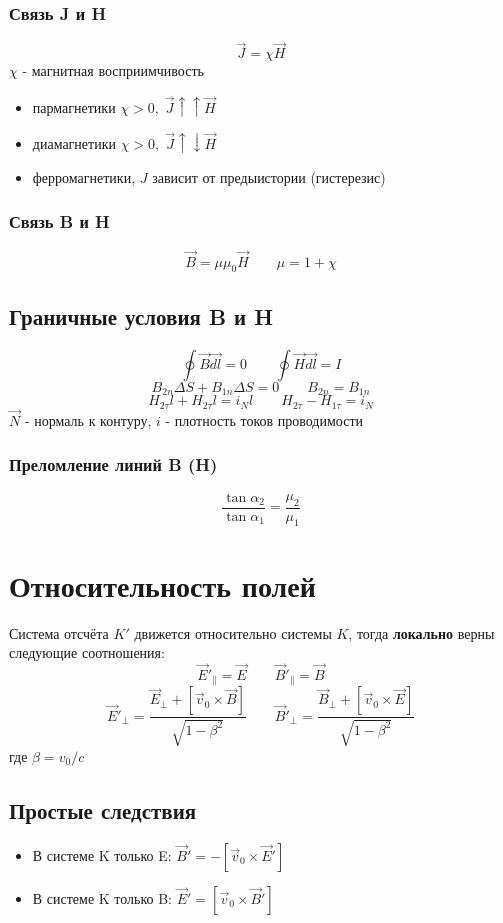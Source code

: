 \documentclass{article}
\begin{document}
\subsubsection{Связь J и H}
\[\vec{J}=\chi\vec{H}\]
$\chi$ - магнитная восприимчивость
\begin{itemize}
    \item пармагнетики $\chi > 0, \; \vec{J}\uparrow\uparrow\vec{H}$
    \item диамагнетики $\chi > 0, \; \vec{J}\uparrow\downarrow\vec{H}$
    \item ферромагнетики, $J$ зависит от предыистории (гистерезис)
\end{itemize}
\subsubsection{Связь B и H}
\[\vec{B}=\mu\mu_{0}\vec{H} \qquad \mu=1+\chi\]

\subsection{Граничные условия B и H}
\[\oint\vec{B}\vec{dl}=0 \qquad \oint\vec{H}\vec{dl}=I\]
\[B_{2n}\Delta S + B_{1n}\Delta S=0 \qquad B_{2n}=B_{1n}\]
\[H_{2\tau}l+H_{2\tau}l=i_{N}l \qquad H_{2\tau}-H_{1\tau}=i_{N}\]
$\vec{N}$ - нормаль к контуру, $i$ - плотность токов проводимости
\subsubsection{Преломление линий B (H)}
\[\frac{\tan\alpha_{2}}{\tan\alpha_{1}}=\frac{\mu_{2}}{\mu_{1}}\]


\section{Относительность полей}
Система отсчёта $K'$ движется относительно системы $K$, тогда \textbf{локально} верны следующие соотношения:
\[\vec{E}'_{\parallel}=\vec{E} \qquad \vec{B}'_{\parallel}=\vec{B}\]
\[\vec{E}'_{\perp}=\frac{\vec{E}_{\perp}+[\vec{v}_{0}\times\vec{B}]}{\sqrt{1-\beta^{2}}} \qquad \vec{B}'_{\perp}=\frac{\vec{B}_{\perp}+[\vec{v}_{0}\times\vec{E}]}{\sqrt{1-\beta^{2}}}\]
где $\beta = v_{0}/c $

\subsection{Простые следствия}
\begin{itemize}
    \item В системе K только E: $\vec{B}'=-[\vec{v}_{0}\times\vec{E}']$
    \item В системе K только B: $\vec{E}'=[\vec{v}_{0}\times\vec{B}']$
\end{itemize}
\end{document}
